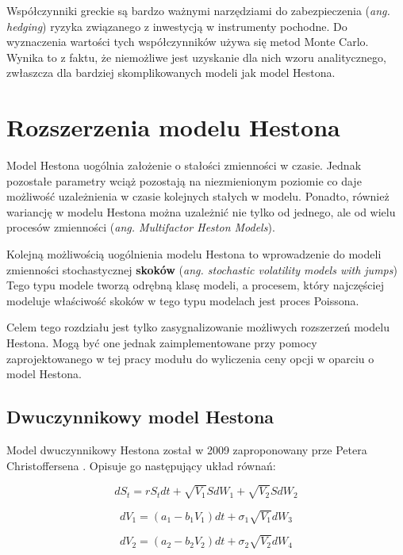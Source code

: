 \documentclass{pracamgr}
\begin{document}
Współczynniki greckie są bardzo ważnymi narzędziami 
do zabezpieczenia (\textit{ang. hedging}) ryzyka 
związanego z inwestycją w instrumenty pochodne.
Do wyznaczenia wartości tych współczynników używa się metod Monte Carlo. Wynika to z faktu, 
że niemożliwe jest uzyskanie dla nich wzoru analitycznego, 
zwłaszcza dla bardziej skomplikowanych modeli jak model Hestona.

\section{Rozszerzenia modelu Hestona}

Model Hestona uogólnia założenie o stałości zmienności w czasie. 
Jednak pozostałe parametry wciąż pozostają na niezmienionym poziomie
co daje możliwość uzależnienia w czasie kolejnych stałych w modelu.
Ponadto, również wariancję w modelu Hestona można uzależnić nie tylko 
od jednego, ale od wielu procesów zmienności (\textit{ang. Multifactor Heston Models}).

Kolejną możliwością uogólnienia modelu Hestona to wprowadzenie do modeli zmienności stochastycznej
\textbf{skoków} (\textit{ang. stochastic volatility models with jumps})
Tego typu modele tworzą odrębną klasę modeli, a procesem, który najczęściej modeluje właściwość
skoków w tego typu modelach jest proces Poissona.

Celem tego rozdziału jest tylko zasygnalizowanie możliwych rozszerzeń modelu Hestona.
Mogą być one jednak zaimplementowane przy pomocy zaprojektowanego w tej pracy modułu 
do wyliczenia ceny opcji w oparciu o model Hestona. 

\subsection{Dwuczynnikowy model Hestona} %
\label{sec:modelDwuczynnikowy}
Model dwuczynnikowy Hestona został w 2009 zaproponowany prze
Petera Christoffersena  \cite{Christoffersen}.
Opisuje go następujący układ równań:

\begin{equation}
dS_t  = r S_t dt + \sqrt{V_1} S dW_1 + \sqrt{V_2} S dW_2
\end{equation} 

\begin{equation}
dV_1  = (a_1 - b_1 V_1)dt + \sigma_1 \sqrt{V_1} dW_3 
\end{equation}

\begin{equation}
dV_2  = (a_2 - b_2 V_2)dt + \sigma_2 \sqrt{V_2} dW_4 
\end{equation}
\end{document}
